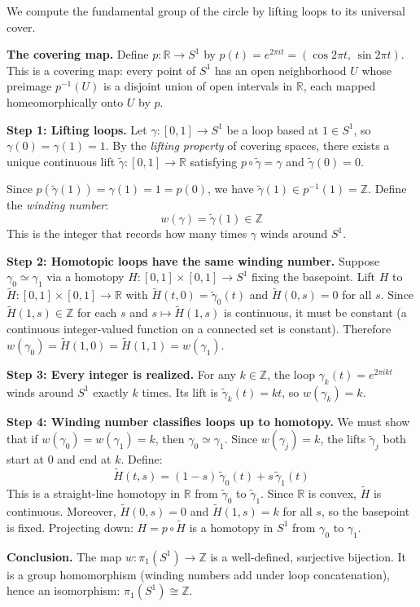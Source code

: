 \begin{example}
\label{ex:pi1s1}
We compute the fundamental group of the circle by lifting loops to its universal cover.

\textbf{The covering map.} Define $p: \mathbb{R} \to S^1$ by $p(t) = e^{2\pi i t} = (\cos 2\pi t,\, \sin 2\pi t)$. This is a covering map: every point of $S^1$ has an open neighborhood $U$ whose preimage $p^{-1}(U)$ is a disjoint union of open intervals in $\mathbb{R}$, each mapped homeomorphically onto $U$ by $p$.

\textbf{Step 1: Lifting loops.}
Let $\gamma: [0,1] \to S^1$ be a loop based at $1 \in S^1$, so $\gamma(0) = \gamma(1) = 1$. By the \textit{lifting property} of covering spaces, there exists a unique continuous lift $\tilde{\gamma}: [0,1] \to \mathbb{R}$ satisfying $p \circ \tilde{\gamma} = \gamma$ and $\tilde{\gamma}(0) = 0$.

Since $p(\tilde{\gamma}(1)) = \gamma(1) = 1 = p(0)$, we have $\tilde{\gamma}(1) \in p^{-1}(1) = \mathbb{Z}$. Define the \textit{winding number}:
\[
w(\gamma) = \tilde{\gamma}(1) \in \mathbb{Z}
\]
This is the integer that records how many times $\gamma$ winds around $S^1$.

\textbf{Step 2: Homotopic loops have the same winding number.}
Suppose $\gamma_0 \simeq \gamma_1$ via a homotopy $H: [0,1] \times [0,1] \to S^1$ fixing the basepoint. Lift $H$ to $\widetilde{H}: [0,1] \times [0,1] \to \mathbb{R}$ with $\widetilde{H}(t,0) = \tilde{\gamma}_0(t)$ and $\widetilde{H}(0,s) = 0$ for all $s$. Since $\widetilde{H}(1,s) \in \mathbb{Z}$ for each $s$ and $s \mapsto \widetilde{H}(1,s)$ is continuous, it must be constant (a continuous integer-valued function on a connected set is constant). Therefore $w(\gamma_0) = \widetilde{H}(1,0) = \widetilde{H}(1,1) = w(\gamma_1)$.

\textbf{Step 3: Every integer is realized.}
For any $k \in \mathbb{Z}$, the loop $\gamma_k(t) = e^{2\pi i k t}$ winds around $S^1$ exactly $k$ times. Its lift is $\tilde{\gamma}_k(t) = kt$, so $w(\gamma_k) = k$.

\textbf{Step 4: Winding number classifies loops up to homotopy.}
We must show that if $w(\gamma_0) = w(\gamma_1) = k$, then $\gamma_0 \simeq \gamma_1$. Since $w(\gamma_j) = k$, the lifts $\tilde{\gamma}_j$ both start at $0$ and end at $k$. Define:
\[
\widetilde{H}(t, s) = (1-s)\,\tilde{\gamma}_0(t) + s\,\tilde{\gamma}_1(t)
\]
This is a straight-line homotopy in $\mathbb{R}$ from $\tilde{\gamma}_0$ to $\tilde{\gamma}_1$. Since $\mathbb{R}$ is convex, $\widetilde{H}$ is continuous. Moreover, $\widetilde{H}(0,s) = 0$ and $\widetilde{H}(1,s) = k$ for all $s$, so the basepoint is fixed. Projecting down: $H = p \circ \widetilde{H}$ is a homotopy in $S^1$ from $\gamma_0$ to $\gamma_1$.

\textbf{Conclusion.} The map $w: \pi_1(S^1) \to \mathbb{Z}$ is a well-defined, surjective bijection. It is a group homomorphism (winding numbers add under loop concatenation), hence an isomorphism: $\pi_1(S^1) \cong \mathbb{Z}$.
\end{example}

